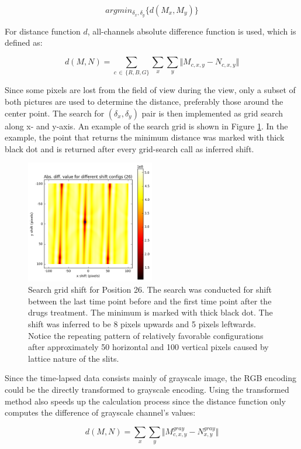 \documentclass[pdftex,12pt,a4paper]{report}
\begin{document}
$$
argmin_{\delta_x, \delta_y} \{d(M_x, M_y)\}
$$

For distance function $d$, all-channels absolute difference function is used, which is defined as:

$$
d(M, N) = \sum_{c \, \in \, \{R, B, G\}} \sum_{x} \sum_{y} \Vert M_{c, x, y} - N_{c, x, y}\Vert
$$

Since some pixels are lost from the field of view during the view, only a subset of both pictures are used to determine the distance, preferably those around the center point. The search for $(\delta_x, \delta_y)$ pair is then implemented as grid search along x- and y-axis. An example of the search grid is shown in Figure \ref{fig:searchgrid}. In the example, the point that returns the minimum distance was marked with thick black dot and is returned after every grid-search call as inferred shift.\\

\begin{figure}[h]
\centering
\includegraphics[width=0.5\textwidth]{search_grid}
\caption{Search grid shift for Position 26. The search was conducted for shift between the last time point before and the first time point after the drugs treatment. The minimum is marked with thick black dot. The shift was inferred to be 8 pixels upwards and 5 pixels leftwards. Notice the repeating pattern of relatively favorable configurations after approximately 50 horizontal and 100 vertical pixels caused by lattice nature of the slits.}
\label{fig:searchgrid}
\end{figure}

Since the time-lapsed data consists mainly of grayscale image, the RGB encoding could be the directly transformed to grayscale encoding. Using the transformed method also speeds up the calculation process since the distance function only computes the difference of grayscale channel's values:

$$
d(M, N) =  \sum_{x} \sum_{y} \Vert M_{c, x, y}^{gray} - N_{x, y}^{gray}\Vert
$$
\end{document}
